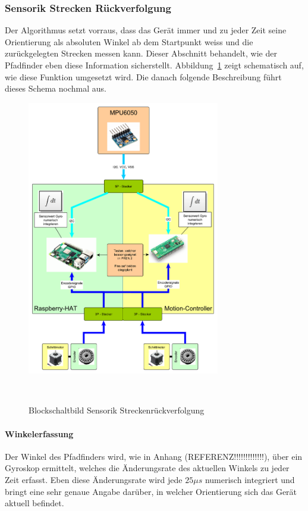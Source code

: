 \documentclass[main.tex]{subfiles} %
\begin{document}

\subsubsection{Sensorik Strecken Rückverfolgung}

Der Algorithmus setzt vorraus, dass das Gerät immer und zu jeder Zeit seine
Orientierung als absoluten Winkel ab dem Startpunkt weiss und die
zurückgelegten Strecken messen kann. Dieser Abschnitt behandelt, wie der
Pfadfinder eben diese Information sicherstellt.
Abbildung~\ref{fig:Blockschaltbild_StreckenTracken} zeigt schematisch auf, wie
diese Funktion umgesetzt wird. Die danach folgende Beschreibung führt dieses
Schema nochmal aus.

\begin{figure}[h!]
    \centering
    \includegraphics[width=0.75\textwidth]{./fig_Strecke_Tracken/Topologie_MPU6050.pdf}
    \caption{Blockschaltbild Sensorik Streckenrückverfolgung}~\label{fig:Blockschaltbild_StreckenTracken}
\end{figure}

\paragraph{Winkelerfassung}
Der Winkel des Pfadfinders wird, wie in Anhang (REFERENZ!!!!!!!!!!!!!), über
ein Gyroskop ermittelt, welches die Änderungsrate des aktuellen Winkels zu
jeder Zeit erfasst. Eben diese Änderungsrate wird jede $25\mu s$ numerisch
integriert und bringt eine sehr genaue Angabe darüber, in welcher Orientierung
sich das Gerät aktuell befindet.
\end{document}
